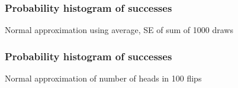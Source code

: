 \documentclass[handout]{beamer}
\begin{document}


   \begin{frame}
   \frametitle{Probability histogram of successes}
   \begin{center}
   \end{center}
   Normal approximation using average, SE of sum of 1000 draws
   \end{frame}



   \begin{frame}
   \frametitle{Probability histogram of successes}
   \begin{center}
   \end{center}
   Normal approximation of number of heads in 100 flips
   \end{frame}
\end{document}

